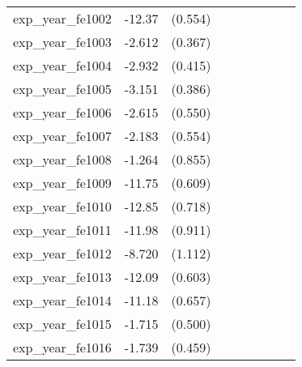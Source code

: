 {\begin{tabular}{l*{4}{cc}}
exp\_year\_fe1002&   -12.37\sym{***}&  (0.554)&                  &         &                  &         &                  &         \\
exp\_year\_fe1003&   -2.612\sym{***}&  (0.367)&                  &         &                  &         &                  &         \\
exp\_year\_fe1004&   -2.932\sym{***}&  (0.415)&                  &         &                  &         &                  &         \\
exp\_year\_fe1005&   -3.151\sym{***}&  (0.386)&                  &         &                  &         &                  &         \\
exp\_year\_fe1006&   -2.615\sym{***}&  (0.550)&                  &         &                  &         &                  &         \\
exp\_year\_fe1007&   -2.183\sym{***}&  (0.554)&                  &         &                  &         &                  &         \\
exp\_year\_fe1008&   -1.264         &  (0.855)&                  &         &                  &         &                  &         \\
exp\_year\_fe1009&   -11.75\sym{***}&  (0.609)&                  &         &                  &         &                  &         \\
exp\_year\_fe1010&   -12.85\sym{***}&  (0.718)&                  &         &                  &         &                  &         \\
exp\_year\_fe1011&   -11.98\sym{***}&  (0.911)&                  &         &                  &         &                  &         \\
exp\_year\_fe1012&   -8.720\sym{***}&  (1.112)&                  &         &                  &         &                  &         \\
exp\_year\_fe1013&   -12.09\sym{***}&  (0.603)&                  &         &                  &         &                  &         \\
exp\_year\_fe1014&   -11.18\sym{***}&  (0.657)&                  &         &                  &         &                  &         \\
exp\_year\_fe1015&   -1.715\sym{***}&  (0.500)&                  &         &                  &         &                  &         \\
exp\_year\_fe1016&   -1.739\sym{***}&  (0.459)&                  &         &                  &         &                  &         \\

\end{tabular}}
